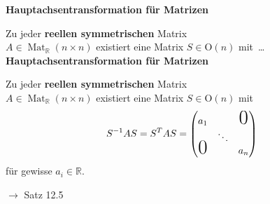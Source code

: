 \documentclass[11pt]{article}
\renewcommand{\cite}[1]{\par\bigskip\hfill{\color{gray}\tiny\(\to\) #1}}
\newcommand{\RR}{\mathbb{R}}
\DeclareMathOperator{\Mat}{Mat}
\let\olddots\dots
\renewcommand{\dots}{\,\olddots\,}
\newenvironment{field}{}{\newpage}
\newif\ifnote
\newenvironment{note}{\notetrue}{\notefalse}
\begin{document}
\begin{note}
    \begin{field}
        \textbf{Hauptachsentransformation für Matrizen}

        Zu jeder \textbf{reellen symmetrischen} Matrix\\
        $A\in\Mat_{\RR}(n\times n)$ existiert eine Matrix $S\in\text{O}(n)$ mit \dots
    \end{field}
    \begin{field}
        \textbf{Hauptachsentransformation für Matrizen}

        Zu jeder \textbf{reellen symmetrischen} Matrix\\
        $A\in\Mat_{\RR}(n\times n)$ existiert eine Matrix $S\in\text{O}(n)$ mit
        \[S^{-1}AS = S^TAS = \begin{pmatrix}
            a_1&&\text{\huge 0}\\
            & \ddots&\\
            \smash{\text{\huge 0}}&& a_n
        \end{pmatrix}\]
        für gewisse $a_i\in\RR$.
        \cite{Satz 12.5}
    \end{field}
\end{note}
\end{document}
